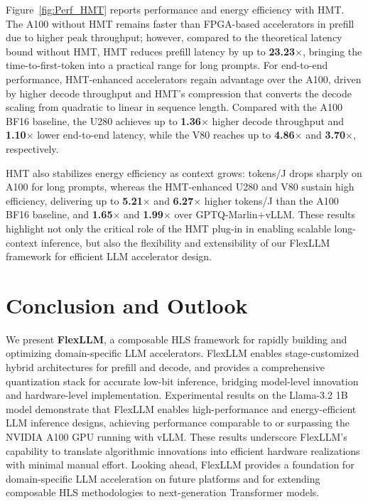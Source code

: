 \documentclass[conference]{IEEEtran}
\begin{document}
Figure~\ref{fig:Perf_HMT} reports performance and energy efficiency with HMT. The A100 without HMT remains faster than FPGA-based accelerators in prefill due to higher peak throughput; however, compared to the theoretical latency bound without HMT, HMT reduces prefill latency by up to \textbf{23.23$\times$}, bringing the time-to-first-token into a practical range for long prompts. For end-to-end performance, HMT-enhanced accelerators regain advantage over the A100, driven by higher decode throughput and HMT’s compression that converts the decode scaling from quadratic to linear in sequence length. Compared with the A100 BF16 baseline, the U280 achieves up to \textbf{1.36$\times$} higher decode throughput and \textbf{1.10$\times$} lower end-to-end latency, while the V80 reaches up to \textbf{4.86$\times$} and \textbf{3.70$\times$}, respectively.

HMT also stabilizes energy efficiency as context grows: tokens/J drops sharply on A100 for long prompts, whereas the HMT-enhanced U280 and V80 sustain high efficiency, delivering up to \textbf{5.21$\times$} and \textbf{6.27$\times$} higher tokens/J than the A100 BF16 baseline, and \textbf{1.65$\times$} and \textbf{1.99$\times$} over GPTQ-Marlin+vLLM. These results highlight not only the critical role of the HMT plug-in in enabling scalable long-context inference, but also the flexibility and extensibility of our FlexLLM framework for efficient LLM accelerator design.







\section{Conclusion and Outlook}
We present \textbf{FlexLLM}, a composable HLS framework for rapidly building and optimizing domain-specific LLM accelerators. FlexLLM enables stage-customized hybrid architectures for prefill and decode, and provides a comprehensive quantization stack for accurate low-bit inference, bridging model-level innovation and hardware-level implementation. Experimental results on the Llama-3.2 1B model demonstrate that FlexLLM enables high-performance and energy-efficient LLM inference designs, achieving performance comparable to or surpassing the NVIDIA A100 GPU running with vLLM. These results underscore FlexLLM’s capability to translate algorithmic innovations into efficient hardware realizations with minimal manual effort. Looking ahead, FlexLLM provides a foundation for domain-specific LLM acceleration on future platforms and for extending composable HLS methodologies to next-generation Transformer models.
\end{document}
